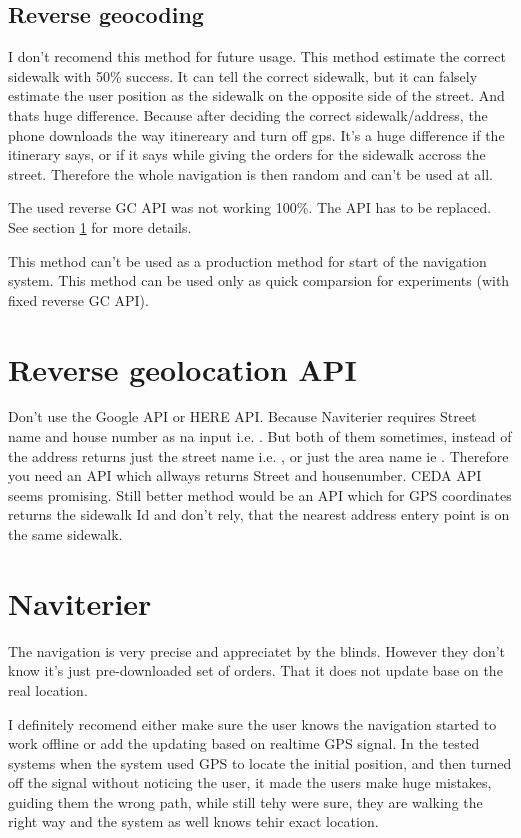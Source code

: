 \documentclass[11pt,oneside,a4paper]{book}
\begin{document}
			\subsection{Reverse geocoding}
			I don't recomend this method for future usage. This method estimate the correct sidewalk with 50\% success. It can tell the correct sidewalk, but it can falsely estimate the user position as the sidewalk on the opposite side of the street.  And thats huge difference. 
			Because after deciding the correct sidewalk/address, the phone downloads the way itinereary and turn off gps. It's a huge difference if the itinerary says,  or if it says  while giving the orders for the sidewalk accross the street. Therefore the whole navigation is then random and can't be used at all.
			
			The used reverse GC API was not working 100\%. The API has to be replaced. See section \ref{subsec:reverse-gc-api} for more details.
						
			This method can't be used as a production method for start of the navigation system.
			This method can be used only as quick comparsion for experiments (with fixed reverse GC API).
			
		\section{Reverse geolocation API}
		\label{subsec:reverse-gc-api}
		Don't use the Google API or HERE API. Because Naviterier requires Street name and house number as na input i.e. . But both of them sometimes, instead of the address  returns just the street name i.e. , or just the area name ie . Therefore you need an API which allways returns Street and housenumber. CEDA API seems promising. Still better method would be an API which for GPS coordinates returns the sidewalk Id and don't rely, that the nearest address entery point is on the same sidewalk.	
		\section{Naviterier}
			The navigation is very precise and appreciatet by the blinds. However they don't know it's just pre-downloaded set of orders. That it does not update base on the real location.
			
			I definitely recomend either make sure the user knows the navigation started to work offline or add the updating based on realtime GPS signal. In the tested systems when the system used GPS to locate the initial position, and then turned off the signal without noticing the user, it made the users make huge mistakes, guiding them the wrong path, while still tehy were sure, they are walking the right way and the system as well knows tehir exact location.
		
\end{document}
